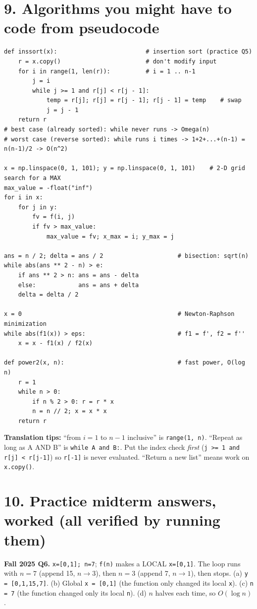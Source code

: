 \documentclass[10pt]{article}
\newcommand{\code}[1]{\lstinline[basicstyle=\ttfamily\small]{#1}}
\begin{document}
\section*{9. Algorithms you might have to code from pseudocode}
\begin{lstlisting}
def inssort(x):                         # insertion sort (practice Q5)
    r = x.copy()                        # don't modify input
    for i in range(1, len(r)):          # i = 1 .. n-1
        j = i
        while j >= 1 and r[j] < r[j - 1]:
            temp = r[j]; r[j] = r[j - 1]; r[j - 1] = temp    # swap
            j = j - 1
    return r
# best case (already sorted): while never runs -> Omega(n)
# worst case (reverse sorted): while runs i times -> 1+2+...+(n-1) = n(n-1)/2 -> O(n^2)

x = np.linspace(0, 1, 101); y = np.linspace(0, 1, 101)    # 2-D grid search for a MAX
max_value = -float("inf")
for i in x:
    for j in y:
        fv = f(i, j)
        if fv > max_value:
            max_value = fv; x_max = i; y_max = j

ans = n / 2; delta = ans / 2                     # bisection: sqrt(n)
while abs(ans ** 2 - n) > e:
    if ans ** 2 > n: ans = ans - delta
    else:            ans = ans + delta
    delta = delta / 2

x = 0                                            # Newton-Raphson minimization
while abs(f1(x)) > eps:                          # f1 = f', f2 = f''
    x = x - f1(x) / f2(x)

def power2(x, n):                                # fast power, O(log n)
    r = 1
    while n > 0:
        if n % 2 > 0: r = r * x
        n = n // 2; x = x * x
    return r
\end{lstlisting}
\textbf{Translation tips:} ``from $i=1$ to $n-1$ inclusive'' is \code{range(1, n)}. ``Repeat as long as A AND B'' is \code{while A and B:}. Put the index check \emph{first} (\code{j >= 1 and r[j] < r[j-1]}) so \code{r[-1]} is never evaluated. ``Return a new list'' means work on \code{x.copy()}.

\section*{10. Practice midterm answers, worked (all verified by running them)}
\textbf{Fall 2025 Q6.} \code{x=[0,1]; n=7}; \code{f(n)} makes a LOCAL \code{x=[0,1]}. The loop runs with $n=7$ (append 15, $n\to3$), then $n=3$ (append 7, $n\to1$), then stops.
(a) \code{y = [0,1,15,7]}. (b) Global \code{x = [0,1]} (the function only changed its local \code{x}). (c) \code{n = 7} (the function changed only its local \code{n}). (d) $n$ halves each time, so $O(\log n)$.
\end{document}
